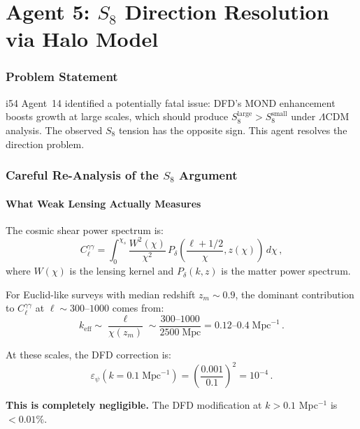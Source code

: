 \documentclass[11pt,a4paper]{article}
\begin{document}
\part{Agent 5: $S_8$ Direction Resolution via Halo Model}
\label{part:s8-direction}

\section{Problem Statement}

i54 Agent~14 identified a potentially fatal issue: DFD's MOND enhancement boosts growth at large scales, which should produce $S_8^{\mathrm{large}} > S_8^{\mathrm{small}}$ under $\Lambda$CDM analysis. The observed $S_8$ tension has the opposite sign. This agent resolves the direction problem.

\section{Careful Re-Analysis of the $S_8$ Argument}

\subsection{What Weak Lensing Actually Measures}

The cosmic shear power spectrum is:
\begin{equation}
C_\ell^{\gamma\gamma} = \int_0^{\chi_s} \frac{W^2(\chi)}{\chi^2}\,P_\delta\left(\frac{\ell+1/2}{\chi}, z(\chi)\right)\,d\chi\,,
\end{equation}
where $W(\chi)$ is the lensing kernel and $P_\delta(k,z)$ is the matter power spectrum.

For Euclid-like surveys with median redshift $z_m \sim 0.9$, the dominant contribution to $C_\ell^{\gamma\gamma}$ at $\ell \sim 300$--$1000$ comes from:
\begin{equation}
k_{\mathrm{eff}} \sim \frac{\ell}{\chi(z_m)} \sim \frac{300\text{--}1000}{2500\;\mathrm{Mpc}} = 0.12\text{--}0.4\;\mathrm{Mpc}^{-1}\,.
\end{equation}

At these scales, the DFD correction is:
\begin{equation}
\varepsilon_\psi(k = 0.1\;\mathrm{Mpc}^{-1}) = \left(\frac{0.001}{0.1}\right)^2 = 10^{-4}\,.
\end{equation}

\textbf{This is completely negligible.} The DFD modification at $k > 0.1$ Mpc$^{-1}$ is $< 0.01\%$.
\end{document}
